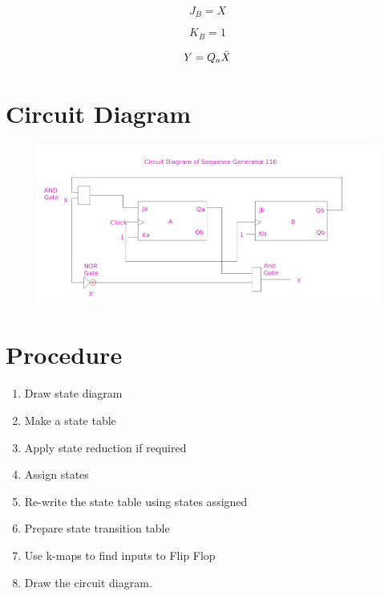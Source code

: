 \documentclass[11pt]{article}
\begin{document}
\begin{karnaugh-map}[4][2][1][$Q_{A}$][$Q_{B}$][$1$]

\end{karnaugh-map}
\[J_B = X\]

\begin{karnaugh-map}[4][2][1][$Q_{A}$][$Q_{B}$][$1$]

\end{karnaugh-map}

\[K_B = 1\]

\begin{karnaugh-map}[4][2][1][$Q_{A}$][$Q_{B}$][$1$]

\end{karnaugh-map}
\[Y=Q_a \Bar{X}\]


\section{Circuit Diagram}
\begin{figure}[H]
	\includegraphics[scale=0.4]{circuit diagram for sg.png}
	\label{fig:}
\end{figure}



\section{Procedure}

\begin{enumerate}
	\item Draw state diagram
	\item Make a state table
	\item Apply state reduction if required
	\item Assign states
	\item Re-write the state table using states assigned
	\item Prepare state transition table
	\item Use k-maps to find inputs to Flip Flop
	\item Draw the circuit diagram.
\end{enumerate}
\end{document}
